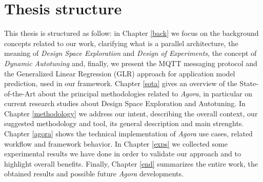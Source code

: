 \section{Thesis structure}

This thesis is structured as follow: in Chapter \ref{back} we focus on the background concepts related to our work, clarifying what is a parallel architecture, the meaning of \textit{Design Space Exploration} and \textit{Design of Experiments}, the concept of \textit{Dynamic Autotuning} and, finally, we present the MQTT messaging protocol and the Generalized Linear Regression (GLR) approach for application model prediction, used in our framework. Chapter \ref{sota} gives an overview of the State-of-the-Art about the principal methodologies related to \textit{Agora}, in particular on current research studies about Design Space Exploration and Autotuning. In Chapter \ref{methodology} we address our intent, describing the overall context, our suggested methodology and tool, its general description and main strenghts. Chapter \ref{agora} shows the technical implementation of \textit{Agora} use cases, related workflow and framework behavior. In Chapter \ref{exps} we collected some experimental results we have done in order to validate our approach and to highlight overall benefits. Finally, Chapter \ref{end} summarizes the entire work, the obtained results and possible future \textit{Agora} developments.
